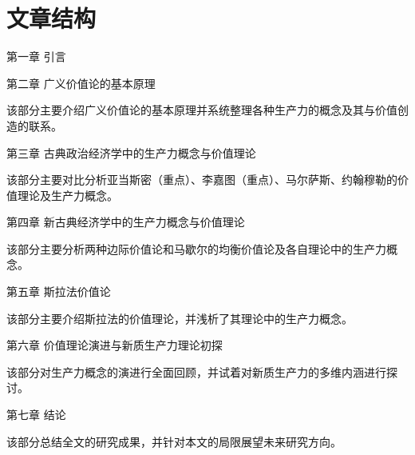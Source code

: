 \section{文章结构}
第一章 \quad 引言

第二章 \quad 广义价值论的基本原理

该部分主要介绍广义价值论的基本原理并系统整理各种生产力的概念及其与价值创造的联系。

第三章 \quad 古典政治经济学中的生产力概念与价值理论

该部分主要对比分析亚当斯密（重点）、李嘉图（重点）、马尔萨斯、约翰穆勒的价值理论及生产力概念。

第四章 \quad 新古典经济学中的生产力概念与价值理论

该部分主要分析两种边际价值论和马歇尔的均衡价值论及各自理论中的生产力概念。

第五章 \quad 斯拉法价值论

该部分主要介绍斯拉法的价值理论，并浅析了其理论中的生产力概念。

第六章 \quad 价值理论演进与新质生产力理论初探

该部分对生产力概念的演进行全面回顾，并试着对新质生产力的多维内涵进行探讨。

第七章 \quad 结论

该部分总结全文的研究成果，并针对本文的局限展望未来研究方向。

